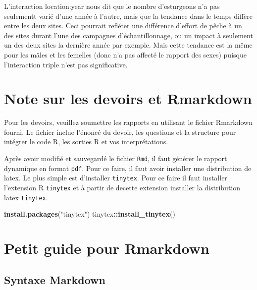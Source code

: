 \documentclass[12pt,]{book}
\newenvironment{Shaded}{\begin{snugshade}}{\end{snugshade}}
\newcommand{\KeywordTok}[1]{\textcolor[rgb]{0.27,0.27,0.27}{\textbf{#1}}}
\newcommand{\NormalTok}[1]{#1}
\newcommand{\OperatorTok}[1]{\textcolor[rgb]{0.43,0.43,0.43}{\textbf{#1}}}
\newcommand{\StringTok}[1]{\textcolor[rgb]{0.5,0.5,0.5}{#1}}
\begin{document}
L'interaction location:year nous dit que le nombre d'esturgeons n'a
pas seulementt varié d'une année à l'autre, mais que la tendance dans
le temps diffère entre les deux sites. Ceci pourrait refléter une
différence d'effort de pêche à un des sites durant l'une des campagnes
d'échantillonnage, ou un impact à seulement un des deux sites la
dernière année par exemple. Mais cette tendance est la même pour les
mâles et les femelles (donc n'a pas affecté le rapport des sexes)
puisque l'interaction triple n'est pas significative.

\cleardoublepage

\hypertarget{appendix-appendice}{%
\appendix {}}


\hypertarget{note-sur-les-devoirs-et-rmarkdown}{%
\chapter{Note sur les devoirs et Rmarkdown}\label{note-sur-les-devoirs-et-rmarkdown}}

Pour les devoirs, veuillez soumettre les rapports en utilisant le fichier Rmarkdown fourni.
Le fichier inclue l'énoncé du devoir, les questions et la structure pour intégrer le code R, les sorties R et vos interprétations.

Après avoir modifié et sauvegardé le fichier \texttt{Rmd}, il faut générer le rapport dynamique en format \texttt{pdf}.
Pour ce faire, il faut avoir installer une distribution de latex. Le plus simple est d'installer \texttt{tinytex}. Pour ce faire il faut installer l'extension R \texttt{tinytex} et à partir de decette extension installer la distribution latex \texttt{tinytex}.

\begin{Shaded}
\begin{Highlighting}[]
\KeywordTok{install.packages}\NormalTok{(}\StringTok{"tinytex"}\NormalTok{)}
\NormalTok{tinytex}\OperatorTok{::}\KeywordTok{install_tinytex}\NormalTok{()}
\end{Highlighting}
\end{Shaded}

\hypertarget{petit-guide-pour-rmarkdown}{%
\chapter{Petit guide pour Rmarkdown}\label{petit-guide-pour-rmarkdown}}

\hypertarget{syntaxe-markdown}{%
\section{Syntaxe Markdown}\label{syntaxe-markdown}}
\end{document}
